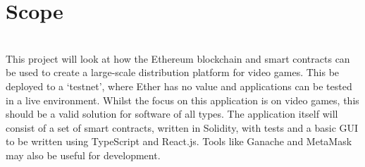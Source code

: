 \section{Scope}
\tbd\\\noindent
This project will look at how the Ethereum blockchain and smart contracts can be used to create a large-scale distribution platform for video games. This be deployed to a `testnet', where Ether has no value and applications can be tested in a live environment. Whilst the focus on this application is on video games, this should be a valid solution for software of all types.
\x
The application itself will consist of a set of smart contracts, written in Solidity, with tests and a basic GUI to be written using TypeScript and React.js. Tools like Ganache and MetaMask may also be useful for development.